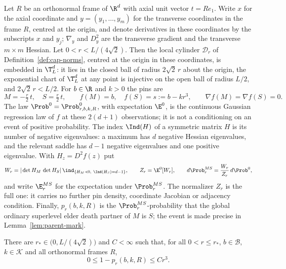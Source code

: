 \begin{definition}\label{def:parent-pinned}
Let $R$ be an orthonormal frame of $\R^d$ with axial unit vector $t=Re_1$. Write $x$ for the axial coordinate and $y=(y_1,\dots,y_m)$ for the transverse coordinates in the frame $R$, centred at the origin, and denote derivatives in these coordinates by the subscripts $x$ and $y_j$; $\nabla_y$ and $D_y^2$ are the transverse gradient and the transverse $m\times m$ Hessian. Let $0<r<L/(4\sqrt2)$. Then the local cylinder $\mathcal D_r$ of Definition~\ref{def:cap-norms}, centred at the origin in these coordinates, is embedded in $\T^d_L$: it lies in the closed ball of radius $2\sqrt2\,r$ about the origin, the exponential chart of $\T^d_L$ at any point is injective on the open ball of radius $L/2$, and $2\sqrt2\,r<L/2$. For $b\in\R$ and $k>0$ the pins are
\begin{equation}\label{eq:parent-pins}
M=-\tfrac r2\,t,\quad S=\tfrac r2\,t,\qquad f(M)=b,\quad f(S)=s:=b-kr^3,\qquad \nabla f(M)=\nabla f(S)=0 .
\end{equation}
The law $\Prob^0=\Prob^0_{r,b,k,R}$, with expectation $\E^0$, is the continuous Gaussian regression law of $f$ at these $2(d+1)$ observations; it is not a conditioning on an event of positive probability. The index $\Ind(H)$ of a symmetric matrix $H$ is its number of negative eigenvalues: a maximum has $d$ negative Hessian eigenvalues, and the relevant saddle has $d-1$ negative eigenvalues and one positive eigenvalue. With $H_z=D^2f(z)$ put
\begin{equation}\label{eq:parent-W}
W_r=|\det H_M\,\det H_S|\,\ind_{\{H_M\prec0,\ \Ind(H_S)=d-1\}},\qquad Z_r=\E^0[W_r],\qquad d\Prob^{MS}_r=\frac{W_r}{Z_r}\,d\Prob^0 ,
\end{equation}
and write $\E^{MS}_r$ for the expectation under $\Prob^{MS}_r$. The normalizer $Z_r$ is the full one: it carries no further pin density, coordinate Jacobian or adjacency condition. Finally, $p_r(b,k,R)$ is the $\Prob^{MS}_r$-probability that the global ordinary superlevel elder death partner of $M$ is $S$; the event is made precise in Lemma~\ref{lem:parent-mark}.
\end{definition}

\begin{theorem}\label{thm:parent-A}
There are $r_*\in\bigl(0,L/(4\sqrt2)\bigr)$ and $C<\infty$ such that, for all $0<r\le r_*$, $b\in\mathcal B$, $k\in\mathcal K$ and all orthonormal frames $R$,
\begin{equation}\label{eq:parent-A}
0\le1-p_r(b,k,R)\le Cr^3 .
\end{equation}
\end{theorem}

